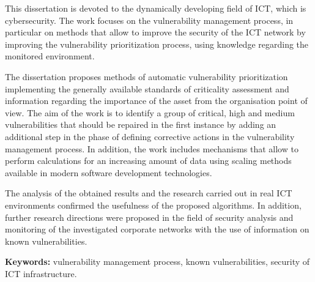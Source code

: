 This dissertation is devoted to the dynamically developing field of ICT, which is cybersecurity. The work focuses on the vulnerability management process, in particular on methods that allow to improve the security of the ICT network by improving the vulnerability prioritization process, using knowledge regarding the monitored environment.

\bigbreak
The dissertation proposes methods of automatic vulnerability prioritization implementing the   generally available standards of criticality assessment and information regarding the importance of the asset from the organisation point of view. The aim of the work is to identify a group of critical, high and medium vulnerabilities that should be repaired in the first instance by adding an additional step in the phase of defining corrective actions in the vulnerability management process. In addition, the work includes mechanisms that allow to perform calculations for an increasing amount of data using scaling methods available in modern software development technologies.

\bigbreak
The analysis of the obtained results and the research carried out in real ICT environments confirmed the usefulness of the proposed algorithms. In addition, further research directions were proposed in the field of security analysis and monitoring of the investigated corporate networks with the use of information on known vulnerabilities.

\vspace*{1cm}
\textbf{Keywords:} vulnerability management process, known vulnerabilities, security of ICT infrastructure.